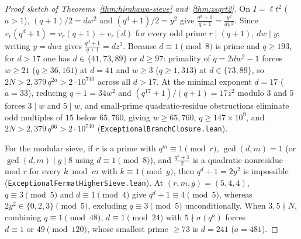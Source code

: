 \documentclass[11pt]{amsart}
\theoremstyle{definition}
\theoremstyle{remark}
\begin{document}
\begin{proof}[Proof sketch of Theorems~\ref{thm:hirakawa-sieve} and~\ref{thm:zsqrt2}]
On $I = \ell t^2$ ($a > 1$), $(q + 1)/2 = d w^2$ and $(q^d + 1)/2 = y^2$ give $\frac{q^d + 1}{q + 1} = \frac{y^2}{d w^2}$. Since $v_r(q^d + 1) = v_r(q + 1) + v_r(d)$ for every odd prime $r \mid (q + 1)$, $d w \mid y$; writing $y = d w z$ gives $\frac{q^d + 1}{q + 1} = d z^2$. Because $d \equiv 1 \pmod 8$ is prime and $q \ge 193$, for $d > 17$ one has $d \in \{41, 73, 89\}$ or $d \ge 97$: primality of $q = 2 d w^2 - 1$ forces $w \ge 21$ ($q \ge 36{,}161$) at $d = 41$ and $w \ge 3$ ($q \ge 1{,}313$) at $d \in \{73, 89\}$, so $2N > 2{,}379\, q^{2a} > 2 \cdot 10^{740}$ across all $d > 17$. At the minimal exponent $d = 17$ ($a = 33$), reducing $q + 1 = 34 w^2$ and $(q^{17} + 1)/(q + 1) = 17 z^2$ modulo $3$ and $5$ forces $3 \mid w$ and $5 \mid w$, and small-prime quadratic-residue obstructions eliminate odd multiples of $15$ below $65{,}760$, giving $w \ge 65{,}760$, $q \ge 147 \times 10^9$, and $2N > 2{,}379\, q^{66} > 2 \cdot 10^{740}$ (\texttt{ExceptionalBranchClosure.lean}).

For the modular sieve, if $r$ is a prime with $q^m \equiv 1 \pmod r$, $\gcd(d, m) = 1$ (or $\gcd(d, m) \mid g \mid 8$ using $d \equiv 1 \pmod 8$), and $\frac{q^k + 1}{2}$ is a quadratic nonresidue mod $r$ for every $k \bmod m$ with $k \equiv 1 \pmod g$, then $q^d + 1 = 2 y^2$ is impossible (\texttt{ExceptionalFermatHigherSieve.lean}). At $(r, m, g) = (5, 4, 4)$, $q \equiv 3 \pmod 5$ and $d \equiv 1 \pmod 4$ give $q^d + 1 \equiv 4 \pmod 5$, whereas $2 y^2 \in \{0, 2, 3\} \pmod 5$, excluding $q \equiv 3 \pmod 5$ unconditionally. When $3, 5 \nmid N$, combining $q \equiv 1 \pmod{48}$, $d \equiv 1 \pmod{24}$ with $5 \nmid \sigma(q^a)$ forces $d \equiv 1 \text{ or } 49 \pmod{120}$, whose smallest prime $\ge 73$ is $d = 241$ ($a = 481$).


\end{proof}
\end{document}
